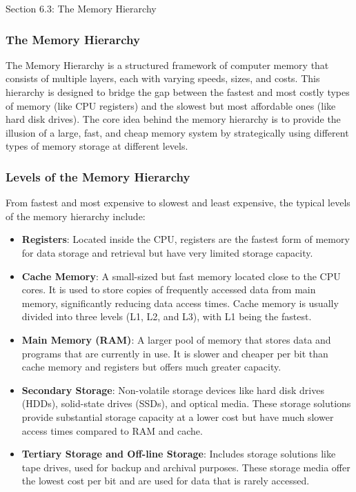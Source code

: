 \begin{notes}{Section 6.3: The Memory Hierarchy}
    \subsubsection*{The Memory Hierarchy}

    The Memory Hierarchy is a structured framework of computer memory that consists of multiple layers, each with varying speeds, sizes, and costs. This hierarchy is designed to bridge the gap between 
    the fastest and most costly types of memory (like CPU registers) and the slowest but most affordable ones (like hard disk drives). The core idea behind the memory hierarchy is to provide the illusion 
    of a large, fast, and cheap memory system by strategically using different types of memory storage at different levels. \vspace*{1em}
    
    \subsubsection*{Levels of the Memory Hierarchy}
    
    From fastest and most expensive to slowest and least expensive, the typical levels of the memory hierarchy include:
    
    \begin{itemize}
        \item \textbf{Registers}: Located inside the CPU, registers are the fastest form of memory for data storage and retrieval but have very limited storage capacity.
        \item \textbf{Cache Memory}: A small-sized but fast memory located close to the CPU cores. It is used to store copies of frequently accessed data from main memory, significantly reducing data 
        access times. Cache memory is usually divided into three levels (L1, L2, and L3), with L1 being the fastest.
        \item \textbf{Main Memory (RAM)}: A larger pool of memory that stores data and programs that are currently in use. It is slower and cheaper per bit than cache memory and registers but offers 
        much greater capacity.
        \item \textbf{Secondary Storage}: Non-volatile storage devices like hard disk drives (HDDs), solid-state drives (SSDs), and optical media. These storage solutions provide substantial storage 
        capacity at a lower cost but have much slower access times compared to RAM and cache.
        \item \textbf{Tertiary Storage and Off-line Storage}: Includes storage solutions like tape drives, used for backup and archival purposes. These storage media offer the lowest cost per bit and 
        are used for data that is rarely accessed.
    \end{itemize}
    

\end{notes}
